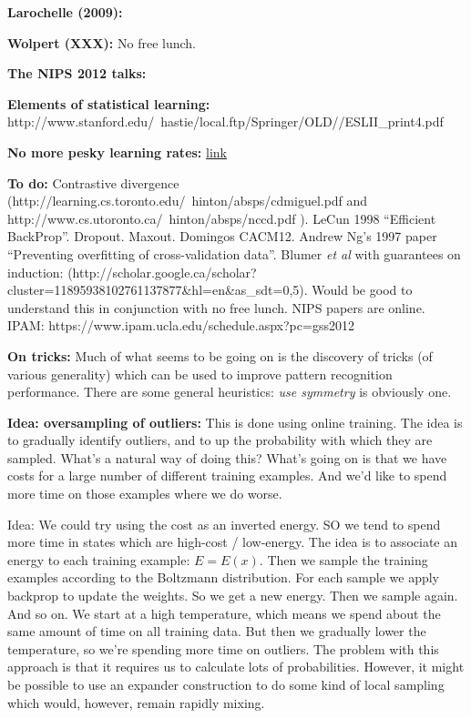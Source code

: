 \documentclass[12pt]{article}
\newcommand{\link}[2]{\href{#1}{#2}}
\begin{document}
\textbf{Larochelle (2009):}

\textbf{Wolpert (XXX):} No free lunch.

\textbf{The NIPS 2012 talks:}

\textbf{Elements of statistical learning:} http://www.stanford.edu/~hastie/local.ftp/Springer/OLD//ESLII_print4.pdf

\textbf{No more pesky learning rates:} \link{http://arxiv.org/pdf/1206.1106.pdf}{link}

\textbf{To do:} Contrastive divergence
(http://learning.cs.toronto.edu/~hinton/absps/cdmiguel.pdf and
http://www.cs.utoronto.ca/~hinton/absps/nccd.pdf ). LeCun 1998
``Efficient BackProp''.  Dropout.  Maxout. Domingos CACM12.  Andrew
Ng's 1997 paper ``Preventing overfitting of cross-validation data''.
Blumer \emph{et al} with guarantees on induction:
(http://scholar.google.ca/scholar?cluster=11895938102761137877\&hl=en\&as\_sdt=0,5).
Would be good to understand this in conjunction with no free lunch.
NIPS papers are online.  IPAM: https://www.ipam.ucla.edu/schedule.aspx?pc=gss2012

\textbf{On tricks:} Much of what seems to be going on is the discovery
of tricks (of various generality) which can be used to improve pattern
recognition performance.  There are some general heuristics: \emph{use
  symmetry} is obviously one.

\textbf{Idea: oversampling of outliers:} This is done using online
training.  The idea is to gradually identify outliers, and to up the
probability with which they are sampled.  What's a natural way of
doing this?  What's going on is that we have costs for a large number
of different training examples.  And we'd like to spend more time on
those examples where we do worse.  

Idea: We could try using the cost as an inverted energy.  SO we tend
to spend more time in states which are high-cost / low-energy.  The
idea is to associate an energy to each training example: $E = E(x)$.
Then we sample the training examples according to the Boltzmann
distribution.  For each sample we apply backprop to update the
weights.  So we get a new energy.  Then we sample again.  And so on.
We start at a high temperature, which means we spend about the same
amount of time on all training data.  But then we gradually lower the
temperature, so we're spending more time on outliers.  The problem
with this approach is that it requires us to calculate lots of
probabilities.  However, it might be possible to use an expander
construction to do some kind of local sampling which would, however,
remain rapidly mixing.
\end{document}
